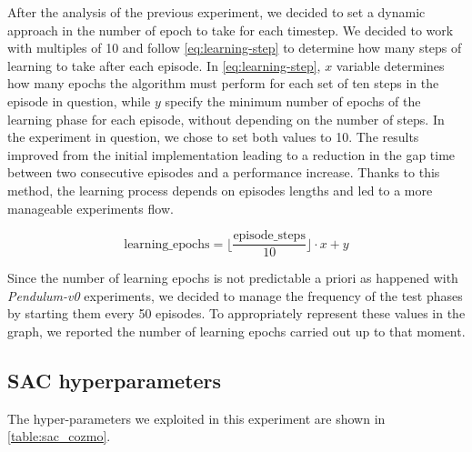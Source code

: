 After the analysis of the previous experiment, we decided to set a dynamic approach in the number of epoch to take for each timestep.
We decided to work with multiples of 10 and follow \vref{eq:learning-step} to determine how many steps of learning to take after each episode.
In \vref{eq:learning-step}, $x$ variable determines how many epochs the algorithm must perform for each set of ten steps in the episode in question, while $y$ specify the minimum number of epochs of the learning phase for each episode, without depending on the number of steps.
In the experiment in question, we chose to set both values to 10.
The results improved from the initial implementation leading to a reduction in the gap time between two consecutive episodes and a performance increase.
Thanks to this method, the learning process depends on episodes lengths and led to a more manageable experiments flow.


\begin{equation}
	\label{eq:learning-step}
	\text{learning\_epochs} = \bigg\lfloor\frac{\text{episode\_steps}}{10}\bigg\rfloor \cdot x + y
\end{equation}

Since the number of learning epochs is not predictable a priori as happened with \textit{Pendulum-v0} experiments, we decided to manage the frequency of the test phases by starting them every 50 episodes. To appropriately represent these values in the graph, we reported the number of learning epochs carried out up to that moment.

\subsection{SAC hyperparameters}

The hyper-parameters we exploited in this experiment are shown in \vref{table:sac_cozmo}.

